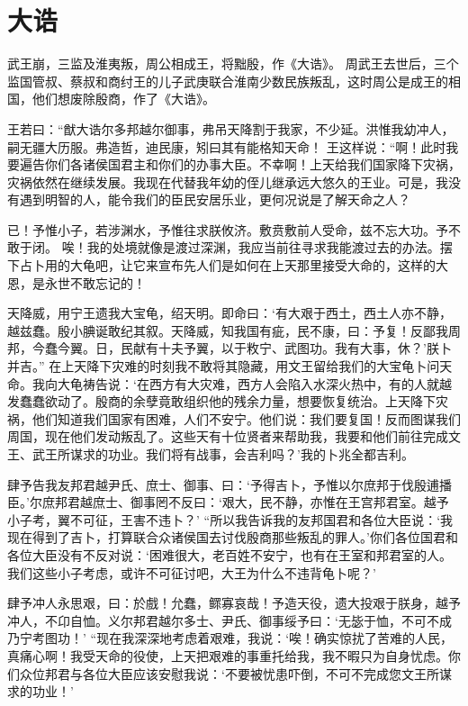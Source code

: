 \documentclass[a4paper,12pt,UTF8,twoside]{ctexbook}
\begin{document}
\chapter{大诰}

武王崩，三监及淮夷叛，周公相成王，将黜殷，作《大诰》。
周武王去世后，三个监国管叔、蔡叔和商纣王的儿子武庚联合淮南少数民族叛乱，这时周公是成王的相国，他们想废除殷商，作了《大诰》。

王若曰：“猷大诰尔多邦越尔御事，弗吊天降割于我家，不少延。洪惟我幼冲人，嗣无疆大历服。弗造哲，迪民康，矧曰其有能格知天命！
王这样说：“啊！此时我要遍告你们各诸侯国君主和你们的办事大臣。不幸啊！上天给我们国家降下灾祸，灾祸依然在继续发展。我现在代替我年幼的侄儿继承远大悠久的王业。可是，我没有遇到明智的人，能令我们的臣民安居乐业，更何况说是了解天命之人？

已！予惟小子，若涉渊水，予惟往求朕攸济。敷贲敷前人受命，兹不忘大功。予不敢于闭。
唉！我的处境就像是渡过深渊，我应当前往寻求我能渡过去的办法。摆下占卜用的大龟吧，让它来宣布先人们是如何在上天那里接受大命的，这样的大恩，是永世不敢忘记的！

天降威，用宁王遗我大宝龟，绍天明。即命曰：‘有大艰于西土，西土人亦不静，越兹蠢。殷小腆诞敢纪其叙。天降威，知我国有疵，民不康，曰：予复！反鄙我周邦，今蠢今翼。日，民献有十夫予翼，以于敉宁、武图功。我有大事，休？’朕卜并吉。”
在上天降下灾难的时刻我不敢将其隐藏，用文王留给我们的大宝龟卜问天命。我向大龟祷告说：‘在西方有大灾难，西方人会陷入水深火热中，有的人就越发蠢蠢欲动了。殷商的余孽竟敢组织他的残余力量，想要恢复统治。上天降下灾祸，他们知道我们国家有困难，人们不安宁。他们说：我们要复国！反而图谋我们周国，现在他们发动叛乱了。这些天有十位贤者来帮助我，我要和他们前往完成文王、武王所谋求的功业。我们将有战事，会吉利吗？’我的卜兆全都吉利。

肆予告我友邦君越尹氏、庶士、御事、曰：‘予得吉卜，予惟以尔庶邦于伐殷逋播臣。’尔庶邦君越庶士、御事罔不反曰：‘艰大，民不静，亦惟在王宫邦君室。越予小子考，翼不可征，王害不违卜？’
“所以我告诉我的友邦国君和各位大臣说：‘我现在得到了吉卜，打算联合众诸侯国去讨伐殷商那些叛乱的罪人。’你们各位国君和各位大臣没有不反对说：‘困难很大，老百姓不安宁，也有在王室和邦君室的人。我们这些小子考虑，或许不可征讨吧，大王为什么不违背龟卜呢？’

肆予冲人永思艰，曰：於戲！允蠢，鳏寡哀哉！予造天役，遗大投艰于朕身，越予冲人，不卬自恤。义尔邦君越尔多士、尹氏、御事绥予曰：‘无毖于恤，不可不成乃宁考图功！’
“现在我深深地考虑着艰难，我说：‘唉！确实惊扰了苦难的人民，真痛心啊！我受天命的役使，上天把艰难的事重托给我，我不暇只为自身忧虑。你们众位邦君与各位大臣应该安慰我说：‘不要被忧患吓倒，不可不完成您文王所谋求的功业！’
\end{document}
